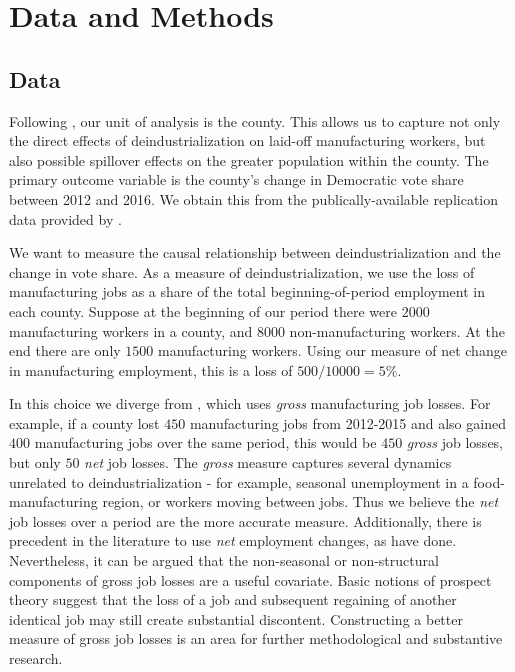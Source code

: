 \documentclass[]{AEA}
\begin{document}
\section{Data and Methods} 
\label{datamethods}

\subsection{Data} 
\label{datasec}

Following \cite{Baccini21}, our unit of analysis is the county. This
allows us to capture not only the direct effects of deindustrialization
on laid-off manufacturing workers, but also possible spillover effects
on the greater population within the county. The primary outcome
variable is the county's change in Democratic vote share between 2012
and 2016. We obtain this from the publically-available replication data
provided by \cite{Baccini21}.

We want to measure the causal relationship between deindustrialization
and the change in vote share. As a measure of deindustrialization, we
use the loss of manufacturing jobs as a share of the total
beginning-of-period employment in each county. Suppose at the beginning
of our period there were \(2000\) manufacturing workers in a county, and
\(8000\) non-manufacturing workers. At the end there are only \(1500\)
manufacturing workers. Using our measure of net change in manufacturing
employment, this is a loss of \(500/10000 = 5\%.\)

In this choice we diverge from \cite{Baccini21}, which uses \emph{gross}
manufacturing job losses. For example, if a county lost \(450\)
manufacturing jobs from 2012-2015 and also gained \(400\) manufacturing
jobs over the same period, this would be \(450\) \emph{gross} job
losses, but only \(50\) \emph{net} job losses. The \emph{gross} measure
captures several dynamics unrelated to deindustrialization - for
example, seasonal unemployment in a food-manufacturing region, or
workers moving between jobs. Thus we believe the \emph{net} job losses
over a period are the more accurate measure. Additionally, there is
precedent in the literature to use \emph{net} employment changes, as
\cite{Autor21} have done. Nevertheless, it can be argued that the
non-seasonal or non-structural components of gross job losses are a
useful covariate. Basic notions of prospect theory suggest that the loss
of a job and subsequent regaining of another identical job may still
create substantial discontent. Constructing a better measure of gross
job losses is an area for further methodological and substantive
research.
\end{document}

